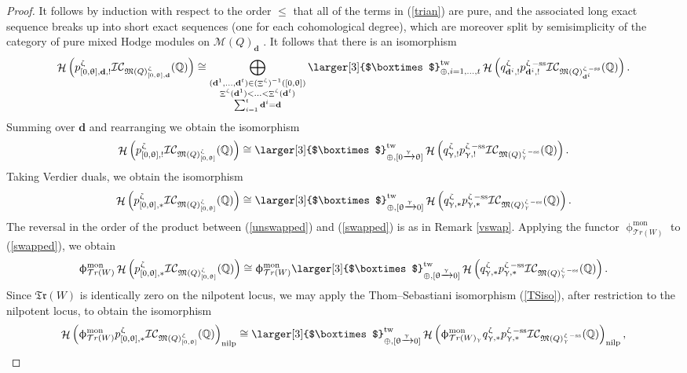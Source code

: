 \documentclass[a4paper,10pt]{amsart}
\newcommand{\dd}{\mathbf{d}}
\newcommand{\Boxtimes}{\mbox{\larger[3]{$\boxtimes$}}}
\newcommand{\QQ}{\mathbb{Q}}
\newcommand{\WW}{\mathcal{T}r(W)}
\newcommand{\WWW}{\mathfrak{Tr}(W)}
\newcommand{\Mst}{\mathfrak{M}}
\newcommand{\Msp}{\mathcal{M}}
\newcommand{\ICS}{\mathcal{IC}}
\newcommand{\phim}[1]{\phi^{\mon}_{#1}}
\renewcommand{\theta}{\uptheta}
\renewcommand{\gamma}{\upgamma}
\renewcommand{\zeta}{\upzeta}
\renewcommand{\phi}{\upphi}
\DeclareMathOperator{\sst}{-ss}
\DeclareMathOperator{\nilp}{nilp}
\DeclareMathOperator{\tw}{tw}
\DeclareMathOperator{\mon}{mon}
\DeclareMathOperator{\Mu}{\Upxi}
\DeclareMathOperator{\Ho}{\mathcal{H}}
\begin{document}
\begin{proof}
It follows by induction with respect to the order $\leq$ that all of the terms in (\ref{trian}) are pure, and the associated long exact sequence breaks up into short exact sequences (one for each cohomological degree), which are moreover split by semisimplicity of the category of pure mixed Hodge modules on $\Msp(Q)_{\dd}$ \cite[(4.5.3)]{Sai90}.  It follows that there is an isomorphism
\[
\Ho\left(p_{[0,\theta],\dd,!}^\zeta\ICS_{\Mst(Q)^{\zeta}_{[0,\theta],\dd}}(\mathbb{Q})\right)\cong\bigoplus_{\substack{(\dd^1,\ldots,\dd^t)\in (\Mu^{\zeta})^{-1}([0,\theta])\\ \Mu^{\zeta}(\dd^1)<\ldots<\Mu^{\zeta}(\dd^t)\\ \sum_{i=1}^t \dd^i=\dd}}\Boxtimes_{\oplus,i=1,\ldots,t}^{\tw}\Ho\left(q^{\zeta}_{\dd^i,!}p^{\zeta\sst}_{\dd^i,!}\ICS_{\Mst(Q)^{\zeta\sst}_{\dd^i}}(\mathbb{Q})\right).
\]
Summing over $\dd$ and rearranging we obtain the isomorphism
\begin{equation}
\label{unswapped}
\Ho\left(p_{[0,\theta],!}^{\zeta}\ICS_{\Mst(Q)_{[0,\theta]}^{\zeta}}(\QQ)\right)\cong\Boxtimes_{\oplus,[0\xrightarrow{\gamma}\theta]}^{\tw}\Ho\left(q^{\zeta}_{\gamma,!}p^{\zeta\sst}_{\gamma,!}\ICS_{\Mst(Q)^{\zeta\sst}_{\gamma}}(\mathbb{Q})\right).
\end{equation}
Taking Verdier duals, we obtain the isomorphism
\begin{equation}
\label{swapped}
\Ho\left(p_{[0,\theta],*}^{\zeta}\ICS_{\Mst(Q)_{[0,\theta]}^{\zeta}}(\QQ)\right)\cong\Boxtimes_{\oplus,[\theta\xrightarrow{\gamma}0]}^{\tw}\Ho\left(q_{\gamma,*}^{\zeta}p^{\zeta\sst}_{\gamma,*}\ICS_{\Mst(Q)^{\zeta\sst}_{\gamma}}(\mathbb{Q})\right).
\end{equation}
The reversal in the order of the product between (\ref{unswapped}) and (\ref{swapped}) is as in Remark \ref{vswap}.  Applying the functor $\phim{\WW}$ to (\ref{swapped}), we obtain
\[
\phim{\WW}\Ho\left(p_{[0,\theta],*}^{\zeta}\ICS_{\Mst(Q)_{[0,\theta]}^{\zeta}}(\QQ)\right)\cong\phim{\WW}\Boxtimes_{\oplus,[\theta\xrightarrow{\gamma}0]}^{\tw}\Ho\left(q^{\zeta}_{\gamma,*}p^{\zeta\sst}_{\gamma,*}\ICS_{\Mst(Q)^{\zeta\sst}_{\gamma}}(\mathbb{Q})\right).
\]
Since $\WWW$ is identically zero on the nilpotent locus, we may apply the Thom--Sebastiani isomorphism (\ref{TSiso}), after restriction to the nilpotent locus, to obtain the isomorphism
\[
\Ho\left(\phim{\WW}p_{[0,\theta],*}^{\zeta}\ICS_{\Mst(Q)_{[0,\theta]}^{\zeta}}(\QQ)\right)_{\nilp}\cong\Boxtimes_{\oplus,[\theta\xrightarrow{\gamma}0]}^{\tw}\Ho\left(\phim{\WW_{\gamma}}q^{\zeta}_{\gamma,*}p^{\zeta\sst}_{\gamma,*}\ICS_{\Mst(Q)^{\zeta\sst}_{\gamma}}(\mathbb{Q})\right)_{\nilp},
\]
\end{proof}
\end{document}
